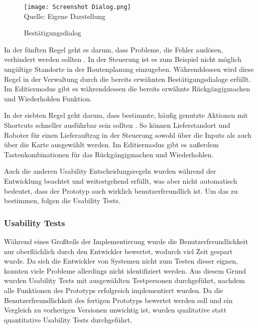 \begin{figure}[H]
    \caption{Bestätigungsdialog}\label{fig:DialogScreenshot}
    \texttt{[image: Screenshot Dialog.png]}
    \\
    Quelle: Eigene Darstellung
\end{figure}

In der fünften Regel geht es darum, dass Probleme, die Fehler auslösen, verhindert werden sollten \cite[Regel 5]{Nielsen.1994}. In der Steuerung ist es zum Beispiel nicht möglich ungültige Standorte in der Routenplanung einzugeben. Währenddessen wird diese Regel in der Verwaltung durch die bereits erwähnten Bestätigungsdialoge erfüllt. Im Editiermodus gibt es währenddessen die bereits erwähnte Rückgängigmachen und Wiederhohlen Funktion.

In der siebten Regel geht darum, dass bestimmte, häufig genutzte Aktionen mit Shortcuts schneller ausführbar sein sollten \cite[Regel 7]{Nielsen.1994}. So können Lieferstandort und Roboter für einen Lieferauftrag in der Steuerung sowohl über die Inputs als auch über die Karte ausgewählt werden. Im Editiermodus gibt es außerdem Tastenkombinationen für das Rückgängigmachen und Wiederhohlen.

Auch die anderen Usability Entscheidungsregeln wurden während der Entwicklung beachtet und weitestgehend erfüllt, was aber nicht automatisch bedeutet, dass der Prototyp auch wirklich benutzerfreundlich ist. Um das zu bestimmen, folgen die Usability Tests.

\subsubsection{Usability Tests}\label{sec:UsabilityTests}
Während eines Großteils der Implementierung wurde die Benutzerfreundlichkeit nur oberflächlich durch den Entwickler bewertet, wodurch viel Zeit gespart wurde. Da sich die Entwickler von Systemen nicht zum Testen dieser eignen, konnten viele Probleme allerdings nicht identifiziert werden. Aus diesem Grund wurden Usability Tests mit ausgewählten Testpersonen durchgeführt, nachdem alle Funktionen des Prototyps erfolgreich implementiert wurden. Da die Benutzerfreundlichkeit des fertigen Prototyps bewertet werden soll und ein Vergleich zu vorherigen Versionen unwichtig ist, wurden qualitative statt quantitative Usability Tests durchgeführt.

